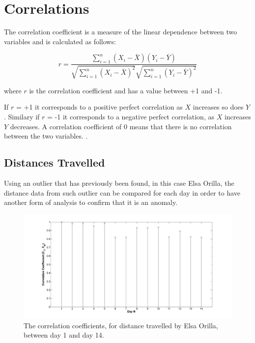 \section{Correlations}
\label{sec:correlations}

\noindent The correlation coefficient is a measure of the linear dependence between two variables and is calculated as follows:

\begin{equation}
r = \frac{\sum_{i=1}^{n}(X_i - \bar{X})(Y_i - \bar{Y})}{\sqrt{\sum_{i=1}^{n}(X_i - \bar{X})^2}\sqrt{\sum_{i=1}^{n}(Y_i - \bar{Y})^2}}
\end{equation}

\noindent where $r$ is the correlation coefficient and has a value between +1 and -1.

\noindent If $r$ = +1 it corresponds to a positive perfect correlation as $X$ increases so does $Y$. Similary if $r$ = -1 it corresponds to a negative perfect correlation, as $X$ increases $Y$ decreases. A correlation coefficient of 0 means that there is no correlation between the two variables. \cite{corrcoeff}.


\subsection{Distances Travelled}
\label{sec:corelldistance}

Using an outlier that has previously been found, in this case Elsa Orilla, the distance data from such outlier can be compared for each day in order to have another form of analysis to confirm that it is an anomaly. \\

\begin{figure}[H]
\centering
\includegraphics[width=1.0\textwidth]{CorrelateDistanceID28.png}
\caption{\label{fig:CorrelateDistanceID28} The correlation coefficients, for distance travelled by Elsa Orilla, between day 1 and day 14.}
\end{figure}

